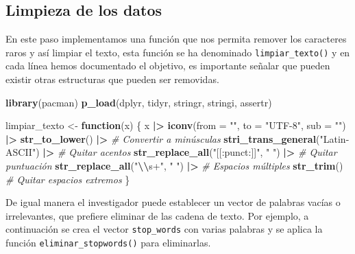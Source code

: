 \documentclass[
  12pt,
]{book}
\newenvironment{Shaded}{\begin{snugshade}}{\end{snugshade}}
\newcommand{\AttributeTok}[1]{\textcolor[rgb]{0.13,0.29,0.53}{#1}}
\newcommand{\CommentTok}[1]{\textcolor[rgb]{0.56,0.35,0.01}{\textit{#1}}}
\newcommand{\ControlFlowTok}[1]{\textcolor[rgb]{0.13,0.29,0.53}{\textbf{#1}}}
\newcommand{\FunctionTok}[1]{\textcolor[rgb]{0.13,0.29,0.53}{\textbf{#1}}}
\newcommand{\NormalTok}[1]{#1}
\newcommand{\OtherTok}[1]{\textcolor[rgb]{0.56,0.35,0.01}{#1}}
\newcommand{\SpecialCharTok}[1]{\textcolor[rgb]{0.81,0.36,0.00}{\textbf{#1}}}
\newcommand{\StringTok}[1]{\textcolor[rgb]{0.31,0.60,0.02}{#1}}
\begin{document}
\subsection{Limpieza de los datos}\label{limpieza-de-los-datos}

En este paso implementamos una función que nos permita remover los caracteres raros y así limpiar el texto, esta función se ha denominado \texttt{limpiar\_texto()} y en cada línea hemos documentado el objetivo, es importante señalar que pueden existir otras estructuras que pueden ser removidas.

\begin{Shaded}
\begin{Highlighting}[]
\FunctionTok{library}\NormalTok{(pacman)}
\FunctionTok{p\_load}\NormalTok{(dplyr, tidyr, stringr, stringi, assertr)}

\NormalTok{limpiar\_texto }\OtherTok{\textless{}{-}} \ControlFlowTok{function}\NormalTok{(x) \{}
\NormalTok{  x }\SpecialCharTok{|\textgreater{}} 
    \FunctionTok{iconv}\NormalTok{(}\AttributeTok{from =} \StringTok{""}\NormalTok{, }\AttributeTok{to =} \StringTok{"UTF{-}8"}\NormalTok{, }\AttributeTok{sub =} \StringTok{""}\NormalTok{) }\SpecialCharTok{|\textgreater{}} 
    \FunctionTok{str\_to\_lower}\NormalTok{() }\SpecialCharTok{|\textgreater{}}                            \CommentTok{\# Convertir a minúsculas}
    \FunctionTok{stri\_trans\_general}\NormalTok{(}\StringTok{"Latin{-}ASCII"}\NormalTok{) }\SpecialCharTok{|\textgreater{}}         \CommentTok{\# Quitar acentos}
    \FunctionTok{str\_replace\_all}\NormalTok{(}\StringTok{"[[:punct:]]"}\NormalTok{, }\StringTok{" "}\NormalTok{) }\SpecialCharTok{|\textgreater{}}       \CommentTok{\# Quitar puntuación}
    \FunctionTok{str\_replace\_all}\NormalTok{(}\StringTok{"}\SpecialCharTok{\textbackslash{}\textbackslash{}}\StringTok{s+"}\NormalTok{, }\StringTok{" "}\NormalTok{) }\SpecialCharTok{|\textgreater{}}              \CommentTok{\# Espacios múltiples}
    \FunctionTok{str\_trim}\NormalTok{()                                   }\CommentTok{\# Quitar espacios extremos}
\NormalTok{\}}
\end{Highlighting}
\end{Shaded}

De igual manera el investigador puede establecer un vector de palabras vacías o irrelevantes, que prefiere eliminar de las cadena de texto. Por ejemplo, a continuación se crea el vector \texttt{stop\_words} con varias palabras y se aplica la función \texttt{eliminar\_stopwords()} para eliminarlas.
\end{document}
